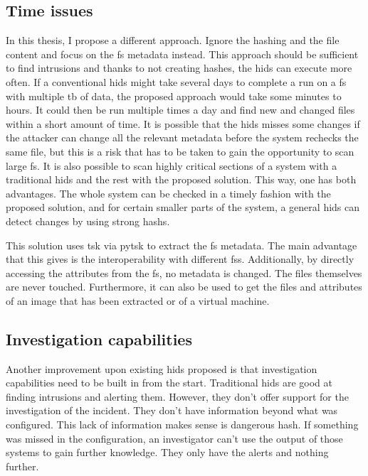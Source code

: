 \subsection{Time issues}

In this thesis, I propose a different approach. Ignore the hashing and the file content and focus on the \gls{fs} \gls{metadata} instead. This approach should be sufficient to find intrusions and thanks to not creating hashes, the \gls{hids} can execute more often. If a conventional \gls{hids} might take several days to complete a run on a \gls{fs} with multiple \gls{tb} of data, the proposed approach would take some minutes to hours. It could then be run multiple times a day and find new and changed files within a short amount of time. It is possible that the \gls{hids} misses some changes if the attacker can change all the relevant \gls{metadata} before the system rechecks the same file, but this is a risk that has to be taken to gain the opportunity to scan large \gls{fs}. It is also possible to scan highly critical sections of a system with a traditional \gls{hids} and the rest with the proposed solution. This way, one has both advantages. The whole system can be checked in a timely fashion with the proposed solution, and for certain smaller parts of the system, a general \gls{hids} can detect changes by using strong \glspl{hash}.

This solution uses \gls{tsk} via \gls{pytsk} to extract the \gls{fs} \gls{metadata}. The main advantage that this gives is the interoperability with different \glspl{fs}. Additionally, by directly accessing the attributes from the \gls{fs}, no \gls{metadata} is changed. The files themselves are never touched. Furthermore, it can also be used to get the files and attributes of an image that has been extracted or of a virtual machine. 

\subsection{Investigation capabilities}
\label{sec:investigation:capabilities}
Another improvement upon existing \gls{hids} proposed is that investigation capabilities need to be built in from the start. Traditional \gls{hids} are good at finding intrusions and alerting them. However, they don't offer support for the investigation of the incident. They don't have information beyond what was configured. This lack of information makes sense is dangerous \gls{hash}. If something was missed in the configuration, an investigator can't use the output of those systems to gain further knowledge. They only have the alerts and nothing further.

